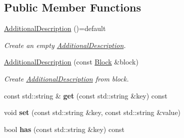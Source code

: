 \subsection*{Public Member Functions}
\begin{DoxyCompactItemize}
\item 
\hyperlink{classndn_1_1security_1_1AdditionalDescription_aeb1bfb457096bcdc633adbb41751055d}{Additional\+Description} ()=default\hypertarget{classndn_1_1security_1_1AdditionalDescription_aeb1bfb457096bcdc633adbb41751055d}{}\label{classndn_1_1security_1_1AdditionalDescription_aeb1bfb457096bcdc633adbb41751055d}

\begin{DoxyCompactList}\small\item\em Create an empty \hyperlink{classndn_1_1security_1_1AdditionalDescription}{Additional\+Description}. \end{DoxyCompactList}\item 
\hyperlink{classndn_1_1security_1_1AdditionalDescription_a4bc6a514b9c2b61b2bf78aecc44a5f22}{Additional\+Description} (const \hyperlink{classndn_1_1Block}{Block} \&block)\hypertarget{classndn_1_1security_1_1AdditionalDescription_a4bc6a514b9c2b61b2bf78aecc44a5f22}{}\label{classndn_1_1security_1_1AdditionalDescription_a4bc6a514b9c2b61b2bf78aecc44a5f22}

\begin{DoxyCompactList}\small\item\em Create \hyperlink{classndn_1_1security_1_1AdditionalDescription}{Additional\+Description} from {\ttfamily block}. \end{DoxyCompactList}\item 
const std\+::string \& {\bfseries get} (const std\+::string \&key) const\hypertarget{classndn_1_1security_1_1AdditionalDescription_a9d87c1a9604f66e66ef925ff7793ce6b}{}\label{classndn_1_1security_1_1AdditionalDescription_a9d87c1a9604f66e66ef925ff7793ce6b}

\item 
void {\bfseries set} (const std\+::string \&key, const std\+::string \&value)\hypertarget{classndn_1_1security_1_1AdditionalDescription_afa514ff7bae9b81ef502898edcdc813b}{}\label{classndn_1_1security_1_1AdditionalDescription_afa514ff7bae9b81ef502898edcdc813b}

\item 
bool {\bfseries has} (const std\+::string \&key) const\hypertarget{classndn_1_1security_1_1AdditionalDescription_a1d19b9fe689e6d3b78704cbb5f7f6d9e}{}\label{classndn_1_1security_1_1AdditionalDescription_a1d19b9fe689e6d3b78704cbb5f7f6d9e}


\end{DoxyCompactItemize}
